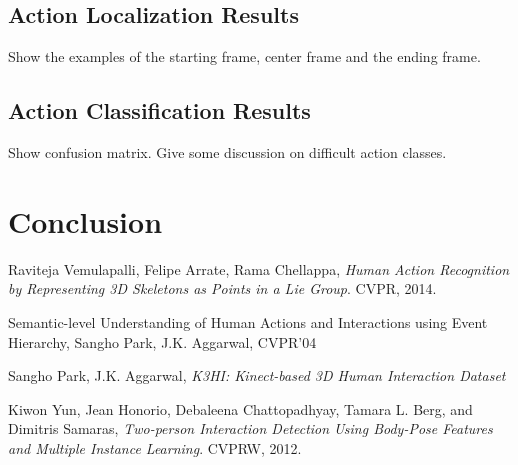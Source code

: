 \documentclass[10pt,twocolumn,letterpaper]{article}
\begin{document}



\subsection{Action Localization Results}
Show the examples of the starting frame, center frame and the ending frame.

\subsection{Action Classification Results}
Show confusion matrix.
Give some discussion on difficult action classes.

\section{Conclusion}


\begin{thebibliography}{9}

  Raviteja  Vemulapalli,
  Felipe Arrate,
  Rama Chellappa,
  \emph{Human Action Recognition by Representing 3D Skeletons as Points in a Lie Group}.
  CVPR,
  2014.

 Semantic-level Understanding of Human Actions and Interactions using Event Hierarchy, Sangho Park, J.K. Aggarwal, CVPR'04

	Sangho Park,
	J.K. Aggarwal,
	\emph{K3HI: Kinect-based 3D Human Interaction Dataset}

	Kiwon Yun, Jean Honorio, Debaleena Chattopadhyay, Tamara L. Berg, and Dimitris Samaras,
	\emph{Two-person Interaction Detection Using Body-Pose Features and Multiple Instance Learning}.
	CVPRW,
	2012.
	


\end{thebibliography}
\end{document}
